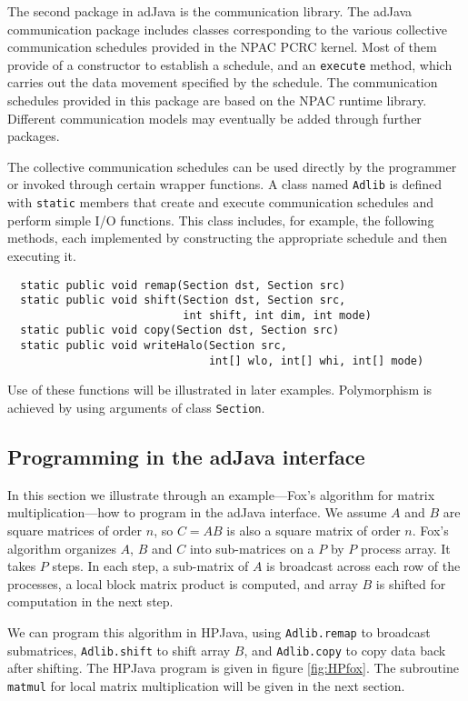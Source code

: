 The second package in adJava is the communication library.
The adJava communication package includes classes corresponding to the
various collective communication schedules provided in the NPAC PCRC
kernel.  Most of them provide of a constructor to establish a schedule,
and an \texttt{execute} method, which carries out the data movement
specified by the schedule.  The communication schedules provided in
this package are based on the NPAC runtime library.  Different
communication models may eventually be added through further packages.

The collective communication schedules can be used directly by
the programmer or invoked through certain wrapper functions.
A class named \texttt{Adlib} is defined
with \texttt{static} members that create and execute
communication schedules and perform simple I/O functions. 
This class includes, for example, the following
methods, each implemented by
constructing the appropriate schedule and then executing it.
\begin{small}
\begin{verbatim}
  static public void remap(Section dst, Section src)
  static public void shift(Section dst, Section src,
                           int shift, int dim, int mode)
  static public void copy(Section dst, Section src)
  static public void writeHalo(Section src,
                               int[] wlo, int[] whi, int[] mode)
\end{verbatim}
\end{small}
Use of these functions will be illustrated in later examples.
Polymorphism is achieved by using arguments of class {\tt Section}.

\subsection{Programming in the adJava interface}
\label{sec:adJava}

In this section we illustrate through an example---Fox's algorithm
\cite{ProgrammingMPI} for matrix multiplication---how to program in the adJava
interface.  We assume $A$ and $B$ are square matrices of order $n$, so
$C=AB$ is also a square matrix of order $n$.  Fox's algorithm organizes
$A$, $B$ and $C$ into sub-matrices on a $P$ by $P$ process array. It
takes $P$ steps.  In each step, a sub-matrix of $A$ is broadcast across
each row of the processes, a local block matrix product is computed,
and array $B$ is shifted for computation in the next step.

We can program this algorithm in HPJava, using \texttt{Adlib.remap}
to broadcast submatrices, \texttt{Adlib.shift} to shift array $B$, and
\texttt{Adlib.copy} to copy data back after shifting.  The HPJava
program is given in figure \ref{fig:HPfox}.
The subroutine \texttt{matmul} for local matrix multiplication
will be given in the next section.

